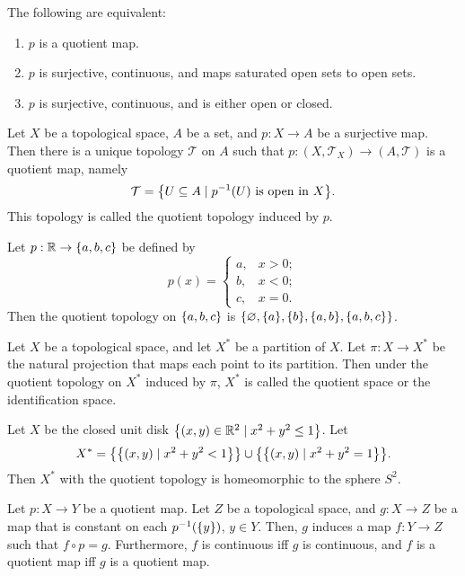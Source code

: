 \begin{prop}
    The following are equivalent:
    \begin{enumerate}[label={(\alph*)}]
        \item $p$ is a quotient map.
        \item $p$ is surjective, continuous, and maps saturated open sets to open sets.
        \item $p$ is surjective, continuous, and is either open or closed.
    \end{enumerate}
\end{prop}

\begin{df}
    Let $X$ be a topological space, $A$ be a set, and $p: X\to A$ be a surjective map. Then there is a unique topology $\mathcal T$ on $A$ such that $p: (X, \mathcal T_X)\to (A, \mathcal T)$ is a quotient map, namely
    \[
    \mathcal T = {\left\{{U\subseteq A \mid p^{-1}(U) \text{ is open in } X}\right\}}.
    \]
    This topology is called the quotient topology induced by $p$. 
\end{df}

\begin{ex}
    Let $p: {\mathbb R} \to {\left\{{a, b, c}\right\}}$ be defined by
    \[
    p(x) = \begin{cases}
        a, & x > 0; \\
        b, & x < 0; \\
        c, & x = 0.
    \end{cases}
    \]
    Then the quotient topology on ${\left\{{a, b, c}\right\}}$ is ${\left\{{\varnothing, {\left\{{a}\right\}}, {\left\{{b}\right\}}, {\left\{{a, b}\right\}}, {\left\{{a, b, c}\right\}}}\right\}}$.
\end{ex}

\begin{df}
    Let $X$ be a topological space, and let $X^*$ be a partition of $X$. Let $\pi: X\to X^*$ be the natural projection that maps each point to its partition. Then under the quotient topology on $X^*$ induced by $\pi$, $X^*$ is called the quotient space or the identification space.
\end{df}

\begin{ex}
    Let $X$ be the closed unit disk ${\left\{{(x, y)\in {\mathbb R}^2 \mid x^2 + y^2 \leq 1}\right\}}$. Let
    \[
    X^* = {\left\{{{\left\{{(x, y) \mid x^2 + y^2 < 1}\right\}}}\right\}} \cup {\left\{{{\left\{{(x, y) \mid x^2 + y^2 = 1}\right\}}}\right\}}.
    \]
    Then $X^*$ with the quotient topology is homeomorphic to the sphere $S^2$.
\end{ex}

\begin{thm}
    Let $p: X\to Y$ be a quotient map. Let $Z$ be a topological space, and $g: X\to Z$ be a map that is constant on each $p^{-1}({\left\{{y}\right\}})$, $y\in Y$. Then, $g$ induces a map $f: Y\to Z$ such that $f\circ p = g$. Furthermore, $f$ is continuous iff $g$ is continuous, and $f$ is a quotient map iff $g$ is a quotient map.
\end{thm}

